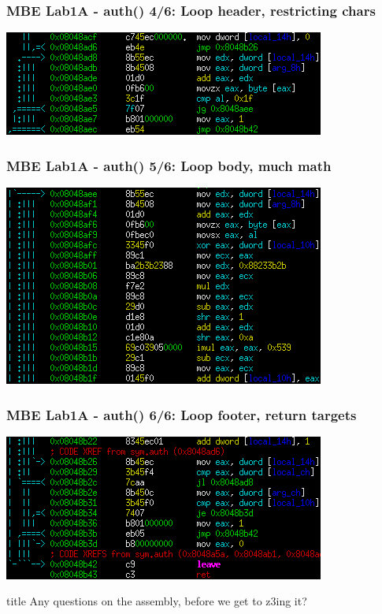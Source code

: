 \documentclass[aspectratio=169]{beamer}
\newcommand{\questionsslide}[1]{
  \begin{frame}
  \vfill
  \centering
  \begin{beamercolorbox}[sep=8pt,center,shadow=true,rounded=true]{title}
    \usebeamerfont{title}Any questions#1?\par%
  \end{beamercolorbox}
  \vfill
  \end{frame}
}
\begin{document}
\begin{frame}[fragile]
\frametitle{MBE Lab1A - auth() 4/6: Loop header, restricting chars}
\includegraphics[width=0.9\paperwidth]{pictures/intel/mbe_lab1a_auth_chunk4.png}
\end{frame}

\begin{frame}[fragile]
\frametitle{MBE Lab1A - auth() 5/6: Loop body, much math}
\includegraphics[width=0.8\paperwidth]{pictures/intel/mbe_lab1a_auth_chunk5.png}
\end{frame}

\begin{frame}[fragile]
\frametitle{MBE Lab1A - auth() 6/6: Loop footer, return targets}
\includegraphics[width=0.9\paperwidth]{pictures/intel/mbe_lab1a_auth_chunk6.png}
\end{frame}

\questionsslide{ on the assembly, before we get to z3ing it}
\end{document}
